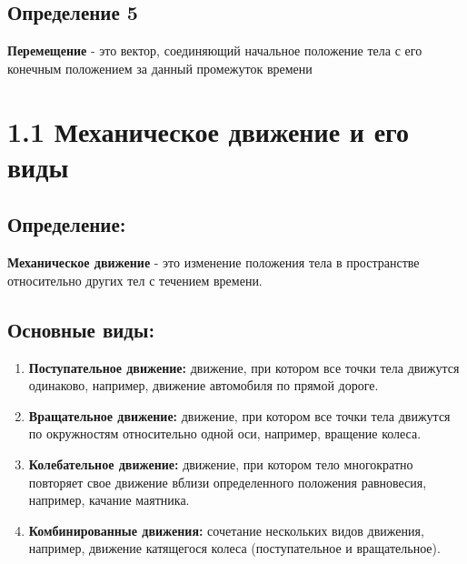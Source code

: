 \documentclass[a4paper,12pt]{article}
\begin{document}
\subsection*{Определение 5}
\vspace{-3pt}
\textbf{Перемещение} - это вектор, соединяющий начальное положение тела с его конечным положением за данный промежуток времени

\vspace{10pt}


\section*{1.1 Механическое движение и его виды}
\vspace{-9pt}
\subsection*{Определение:}
\vspace{-3pt}

\textbf{Механическое движение} - это изменение положения тела в пространстве относительно других тел с течением времени.

\vspace{-9pt}
\subsection*{Основные виды:}
\vspace{-3pt}

\begin{enumerate} [itemsep=0pt, topsep=0pt, parsep=3pt]
    \item \textbf{Поступательное движение:} движение, при котором все точки тела движутся одинаково, например, движение автомобиля по прямой дороге.
    \item \textbf{Вращательное движение:} движение, при котором все точки тела движутся по окружностям относительно одной оси, например, вращение колеса.
    \item \textbf{Колебательное движение:} движение, при котором тело многократно повторяет свое движение вблизи определенного положения равновесия, например, качание маятника.
    \item \textbf{Комбинированные движения:} сочетание нескольких видов движения, например, движение катящегося колеса (поступательное и вращательное).
\end{enumerate}
\end{document}
